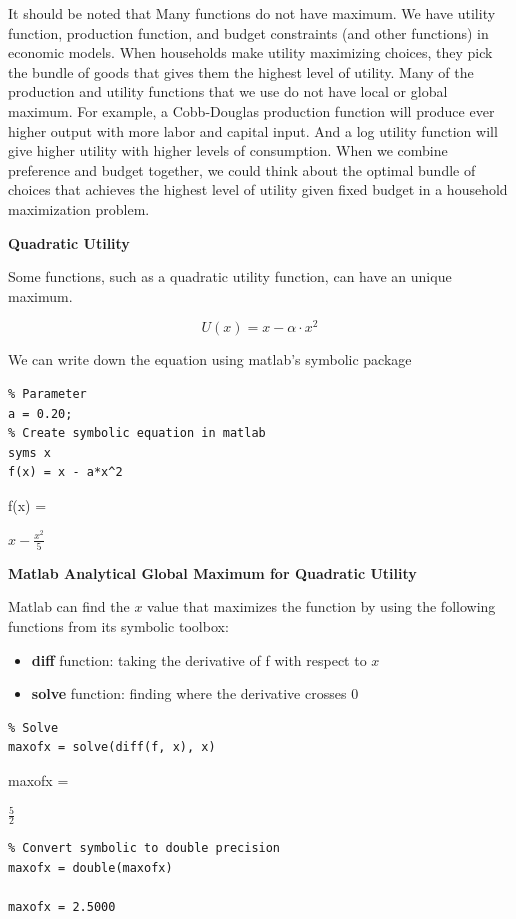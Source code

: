 \documentclass[
]{book}
\begin{document}
It should be noted that Many functions do not have maximum. We have
utility function, production function, and budget constraints (and other
functions) in economic models. When households make utility maximizing
choices, they pick the bundle of goods that gives them the highest level
of utility. Many of the production and utility functions that we use do
not have local or global maximum. For example, a Cobb-Douglas production
function will produce ever higher output with more labor and capital
input. And a log utility function will give higher utility with higher
levels of consumption. When we combine preference and budget together,
we could think about the optimal bundle of choices that achieves the
highest level of utility given fixed budget in a household maximization
problem.

\textbf{Quadratic Utility}

Some functions, such as a quadratic utility function, can have an unique
maximum.

\[U(x)=x-\alpha \cdot x^2\]

We can write down the equation using matlab's symbolic package

\begin{verbatim}
% Parameter
a = 0.20;
% Create symbolic equation in matlab
syms x
f(x) = x - a*x^2
\end{verbatim}

f(x) =

\(\displaystyle x-\frac{x^2 }{5}\)

\textbf{Matlab Analytical Global Maximum for Quadratic Utility}

Matlab can find the \(x\) value that maximizes the function by using the
following functions from its symbolic toolbox:

\begin{itemize}
\item
  \textbf{diff} function: taking the derivative of f with respect to \(x\)
\item
  \textbf{solve} function: finding where the derivative crosses \(0\)
\end{itemize}

\begin{verbatim}
% Solve
maxofx = solve(diff(f, x), x)
\end{verbatim}

maxofx =

\(\displaystyle \frac{5}{2}\)

\begin{verbatim}
% Convert symbolic to double precision
maxofx = double(maxofx)

maxofx = 2.5000
\end{verbatim}
\end{document}
